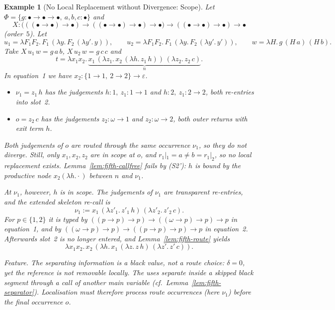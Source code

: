 \documentclass[10pt,a4paper]{article}
\theoremstyle{plain}%
\newtheorem{example}[theorem]{Example}
\begin{document}
\begin{example}[No Local Replacement without Divergence: Scope]\label{ex:ex-scope}
Let $\Phi = \{g : \bullet\to\bullet\to\bullet,\ a,b,c : \bullet\}$ and
\[
X : \big(((\bullet\to\bullet)\to\bullet) \to ((\bullet\to\bullet)\to\bullet) \to \bullet\big) \to ((\bullet\to\bullet)\to\bullet) \to \bullet
\]
(order~$5$).
Let
\[
u_1 = \lambda F_1F_2.\,F_1\,(\lambda y.\,F_2\,(\lambda y'.\,y)),
\qquad
u_2 = \lambda F_1F_2.\,F_1\,(\lambda y.\,F_2\,(\lambda y'.\,y')),
\qquad
w = \lambda H.\,g\,(H\,a)\,(H\,b).
\]
Take $X\,u_1\,w = g\,a\,b$, $X\,u_2\,w = g\,c\,c$ and
\[
t = \lambda x_1x_2.\,\underbrace{x_1\,(\lambda z_1.\,x_2\,(\lambda h.\,z_1\,h))\,(\lambda z_2.\,z_2\,c)}_{n}.
\]
In equation~1 we have $x_2 : \{1 \to 1,\ 2 \to 2\} \to \varepsilon$.
\begin{itemize}
\item $\nu_1 = z_1\,h$ has the judgements $h : 1,\ z_1 : 1 \to 1$ and $h : 2,\ z_1 : 2 \to 2$, both re-entries into slot~2.
\item $o = z_2\,c$ has the judgements $z_2 : \omega \to 1$ and $z_2 : \omega \to 2$, both outer returns with exit term $h$.
\end{itemize}
Both judgements of $o$ are routed through the same occurrence $\nu_1$, so they do not diverge.
Still, only $x_1, x_2, z_2$ are in scope at $o$, and $r_1|_1 = a \neq b = r_1|_2$, so no local replacement exists.
Lemma~\ref{lem:fifth-callfree} fails by (S2'): $h$ is bound by the productive node $x_2(\lambda h.\cdot)$ between $n$ and $\nu_1$.

At $\nu_1$, however, $h$ is in scope.
The judgements of $\nu_1$ are transparent re-entries, and the extended skeleton re-call is
\[
\nu_1 := x_1\,(\lambda z'_1.\,z'_1\,h)\,(\lambda z'_2.\,z'_2\,c).
\]
For $p \in \{1,2\}$ it is typed by $((p \to p) \to p) \to ((\omega \to p) \to p) \to p$ in equation~1, and by $((\omega \to p) \to p) \to ((p \to p) \to p) \to p$ in equation~2.
Afterwards slot~2 is no longer entered, and Lemma~\ref{lem:fifth-route} yields
\[
\lambda x_1x_2.\,x_2\,(\lambda h.\,x_1\,(\lambda z.\,z\,h)\,(\lambda z'.\,z'\,c)).
\]

\emph{Feature.}
The separating information is a black value, not a route choice: $\delta = 0$, yet the reference is not removable locally.
The uses separate inside a skipped black segment through a call of another main variable (cf.\ Lemma~\ref{lem:fifth-separator}).
Localisation must therefore process route occurrences (here $\nu_1$) before the final occurrence $o$.
\end{example}
\end{document}
